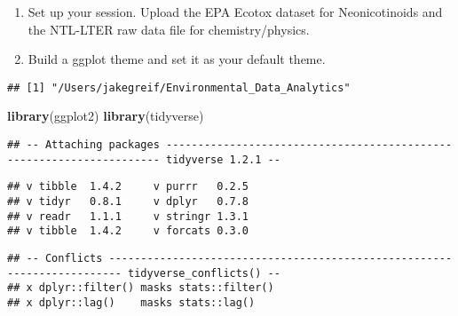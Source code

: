 \documentclass[]{article}
\newenvironment{Shaded}{\begin{snugshade}}{\end{snugshade}}
\newcommand{\KeywordTok}[1]{\textcolor[rgb]{0.13,0.29,0.53}{\textbf{#1}}}
\newcommand{\StringTok}[1]{\textcolor[rgb]{0.31,0.60,0.02}{#1}}
\newcommand{\CommentTok}[1]{\textcolor[rgb]{0.56,0.35,0.01}{\textit{#1}}}
\newcommand{\OperatorTok}[1]{\textcolor[rgb]{0.81,0.36,0.00}{\textbf{#1}}}
\newcommand{\NormalTok}[1]{#1}
\begin{document}
\begin{enumerate}
\def\labelenumi{\arabic{enumi}.}
\item
  Set up your session. Upload the EPA Ecotox dataset for Neonicotinoids
  and the NTL-LTER raw data file for chemistry/physics.
\item
  Build a ggplot theme and set it as your default theme.
\end{enumerate}

\begin{Shaded}
\end{Shaded}

\begin{verbatim}
## [1] "/Users/jakegreif/Environmental_Data_Analytics"
\end{verbatim}

\begin{Shaded}
\begin{Highlighting}[]
\KeywordTok{library}\NormalTok{(ggplot2)}
\KeywordTok{library}\NormalTok{(tidyverse)}
\end{Highlighting}
\end{Shaded}

\begin{verbatim}
## -- Attaching packages --------------------------------------------------------------------- tidyverse 1.2.1 --
\end{verbatim}

\begin{verbatim}
## v tibble  1.4.2     v purrr   0.2.5
## v tidyr   0.8.1     v dplyr   0.7.8
## v readr   1.1.1     v stringr 1.3.1
## v tibble  1.4.2     v forcats 0.3.0
\end{verbatim}

\begin{verbatim}
## -- Conflicts ------------------------------------------------------------------------ tidyverse_conflicts() --
## x dplyr::filter() masks stats::filter()
## x dplyr::lag()    masks stats::lag()
\end{verbatim}

\begin{Shaded}
\end{Shaded}
\end{document}
